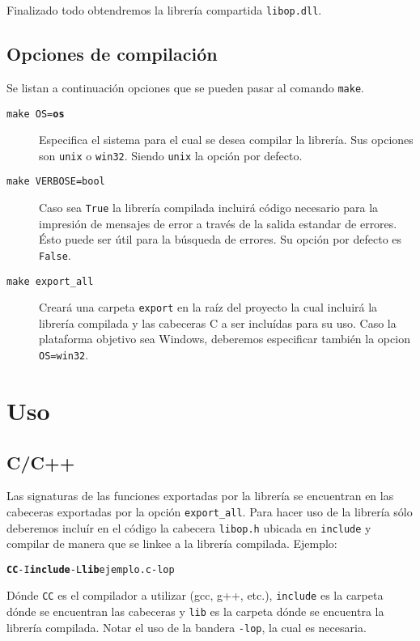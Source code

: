 \documentclass[12pt,a4paper,final]{article}
\begin{document}
			Finalizado todo obtendremos la librería compartida \texttt{libop.dll}.
			
	\subsection{Opciones de compilación}
		Se listan a continuación opciones que se pueden pasar al comando \texttt{make}.
		
		\begin{description}
			\item [\texttt{make OS=\textbf{os}}] Especifica el sistema para el cual se desea compilar la librería.
				Sus opciones son \texttt{unix} o \texttt{win32}. Siendo \texttt{unix} la opción por defecto.
			\item [\texttt{make VERBOSE=bool}] Caso sea \texttt{True} la librería compilada incluirá código 
				necesario para la impresión de mensajes de error a través de la salida estandar de errores. Ésto
				puede ser útil para la búsqueda de errores. Su opción por defecto es \texttt{False}.
			\item [\texttt{make export\_all}] Creará una carpeta \texttt{export} en la raíz del proyecto la 
				cual incluirá la librería compilada y las cabeceras C a ser incluídas para su uso. Caso la
				plataforma objetivo sea Windows, deberemos especificar también la opcion \texttt{OS=win32}.
		\end{description}

\section{Uso}
	\subsection{C/C++}
		Las signaturas de las funciones exportadas por la librería se encuentran en las cabeceras
		exportadas por la opción \texttt{export\_all}. Para hacer uso de la librería sólo deberemos incluír
		en el código la cabecera \texttt{libop.h} ubicada en \texttt{include} y compilar de manera que se linkee
		a la librería compilada. Ejemplo:
		
		\begin{alltt}
			\textbf{CC} -I\textbf{include} -L\textbf{lib} ejemplo.c -lop
		\end{alltt}
		
		Dónde \texttt{CC} es el compilador a utilizar (gcc, g++, etc.), \texttt{include} es la carpeta dónde
		se encuentran las cabeceras y \texttt{lib} es la carpeta dónde se encuentra la librería compilada.
		Notar el uso de la bandera \texttt{-lop}, la cual es necesaria.
		
\end{document}
